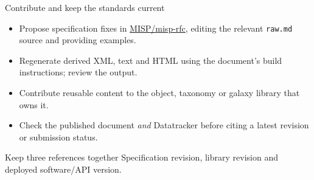 \begin{frame}{Contribute and keep the standards current}
\begin{itemize}
  \item Propose specification fixes in \href{https://github.com/MISP/misp-rfc}{MISP/misp-rfc}, editing the relevant \texttt{raw.md} source and providing examples.
  \item Regenerate derived XML, text and HTML using the document's build instructions; review the output.
  \item Contribute reusable content to the object, taxonomy or galaxy library that owns it.
  \item Check the published document \emph{and} Datatracker before citing a latest revision or submission status.
\end{itemize}
\begin{block}{Keep three references together}
Specification revision, library revision and deployed software/API version.
\end{block}
\end{frame}
